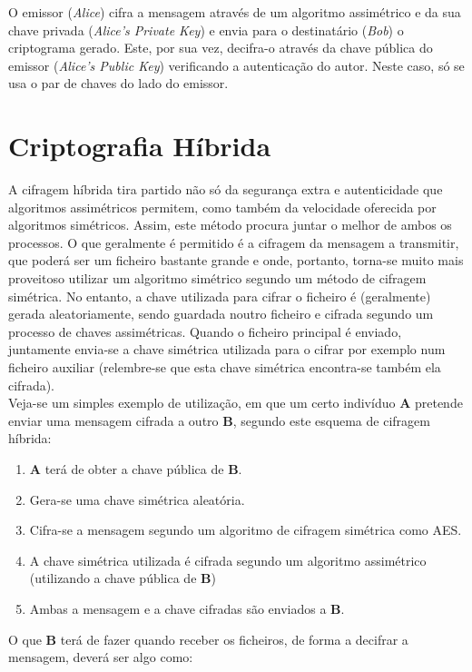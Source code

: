 \documentclass[a4paper,11pt,openright,oneside]{report}
\begin{document}
O emissor (\textit{Alice}) cifra a mensagem através de um algoritmo assimétrico e da sua chave privada (\textit{Alice’s Private Key}) e envia para o destinatário (\textit{Bob}) o criptograma gerado. Este, por sua vez, decifra-o através da chave pública do emissor (\textit{Alice’s Public Key}) verificando a autenticação do autor. Neste caso, só se usa o par de chaves do lado do emissor.

\section{Criptografia Híbrida}
\label{chap.híbrida}

A cifragem híbrida tira partido não só da segurança extra e autenticidade que algoritmos assimétricos permitem, como também da velocidade oferecida por algoritmos simétricos. Assim, este método procura juntar o melhor de ambos os processos. O que geralmente é permitido é a cifragem da mensagem a transmitir, que poderá ser um ficheiro bastante grande e onde, portanto, torna-se muito mais proveitoso utilizar um algoritmo simétrico segundo um método de cifragem simétrica. No entanto, a chave utilizada para cifrar o ficheiro é (geralmente) gerada aleatoriamente, sendo guardada noutro ficheiro e cifrada segundo um processo de chaves assimétricas. Quando o ficheiro principal é enviado, juntamente envia-se a chave simétrica utilizada para o cifrar por exemplo num ficheiro auxiliar (relembre-se que esta chave simétrica encontra-se também ela cifrada).\\

Veja-se um simples exemplo de utilização, em que um certo indivíduo \textbf{A} pretende enviar uma mensagem cifrada a outro \textbf{B}, segundo este esquema de cifragem híbrida:

\begin{enumerate}
\item \textbf{A} terá de obter a chave pública de \textbf{B}.
\item Gera-se uma chave simétrica aleatória.
\item Cifra-se a mensagem segundo um algoritmo de cifragem simétrica como AES.
\item A chave simétrica utilizada é cifrada segundo um algoritmo assimétrico (utilizando a chave pública de \textbf{B})
\item Ambas a mensagem e a chave cifradas são enviados a \textbf{B}.
\end{enumerate}

O que \textbf{B} terá de fazer quando receber os ficheiros, de forma a decifrar a mensagem, deverá ser algo como:
\end{document}
